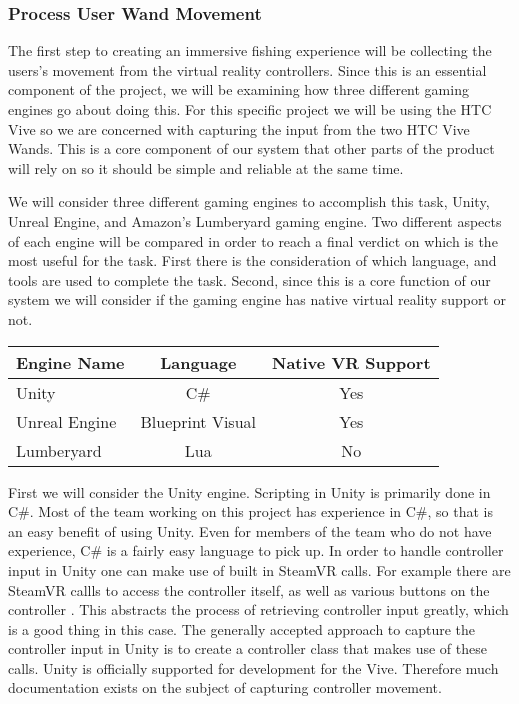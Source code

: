 \documentclass[10pt,journal,compsoc,onecolumn, draftclsnofoot]{IEEEtran}
\begin{document}
\subsubsection{Process User Wand Movement}
The first step to creating an immersive fishing experience will be collecting the users's movement from the virtual reality controllers.
Since this is an essential component of the project, we will be examining how three different gaming engines go about doing this.
For this specific project we will be using the HTC Vive so we are concerned with capturing the input from the two HTC Vive Wands.
This is a core component of our system that other parts of the product will rely on so it should be simple and reliable at the same time.

We will consider three different gaming engines to accomplish this task, Unity, Unreal Engine, and Amazon's Lumberyard gaming engine.
Two different aspects of each engine will be compared in order to reach a final verdict on which is the most useful for the task.
First there is the consideration of which language, and tools are used to complete the task.
Second, since this is a core function of our system we will consider if the gaming engine has native virtual reality support or not.

\vspace{2mm}
\begin{table}[h!]
\centering
  \begin{tabular}{ | l || c | c |  }
  \hline
  Engine Name & Language & Native VR Support\\
  \hline
  Unity  & C\# & Yes\\ \hline
  Unreal Engine & Blueprint Visual & Yes\\ \hline
  Lumberyard & Lua & No\\ \hline
  \hline
  \end{tabular}
\end{table}
\vspace{2mm}

First we will consider the Unity engine. Scripting in Unity is primarily done in C\#.
Most of the team working on this project has experience in C\#, so that is an easy benefit of using Unity.
Even for members of the team who do not have experience, C\# is a fairly easy language to pick up.
In order to handle controller input in Unity one can make use of built in SteamVR calls.
For example there are SteamVR callls to access the controller itself, as well as various buttons on the controller \cite{steamvr_controllers}.
This abstracts the process of retrieving controller input greatly, which is a good thing in this case.
The generally accepted approach to capture the controller input in Unity is to create a controller class that makes use of these calls.
Unity is officially supported for development for the Vive.
Therefore much documentation exists on the subject of capturing controller movement.
\end{document}
